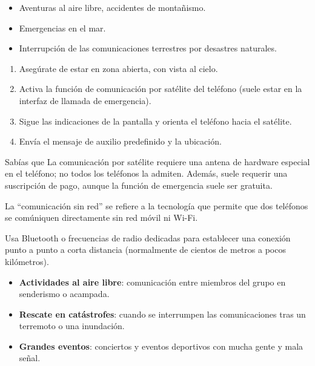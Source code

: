 \begin{itemize}
  \item Aventuras al aire libre, accidentes de montañismo.
  \item Emergencias en el mar.
  \item Interrupción de las comunicaciones terrestres por desastres naturales.
\end{itemize}


\begin{enumerate}
  \item Asegúrate de estar en zona abierta, con vista al cielo.
  \item Activa la función de comunicación por satélite del teléfono (suele estar en la interfaz de llamada de emergencia).
  \item Sigue las indicaciones de la pantalla y orienta el teléfono hacia el satélite.
  \item Envía el mensaje de auxilio predefinido y la ubicación.
\end{enumerate}

\begin{tcbinfo}{Sabías que}
La comunicación por satélite requiere una antena de hardware especial en el teléfono; no todos los teléfonos la admiten. Además, suele requerir una suscripción de pago, aunque la función de emergencia suele ser gratuita.

\end{tcbinfo}


La “comunicación sin red” se refiere a la tecnología que permite que dos teléfonos se comúniquen directamente sin red móvil ni Wi-Fi.


Usa Bluetooth o frecuencias de radio dedicadas para establecer una conexión punto a punto a corta distancia (normalmente de cientos de metros a pocos kilómetros).


\begin{itemize}
  \item \textbf{Actividades al aire libre}: comunicación entre miembros del grupo en senderismo o acampada.
  \item \textbf{Rescate en catástrofes}: cuando se interrumpen las comunicaciones tras un terremoto o una inundación.
  \item \textbf{Grandes eventos}: conciertos y eventos deportivos con mucha gente y mala señal.
\end{itemize}

